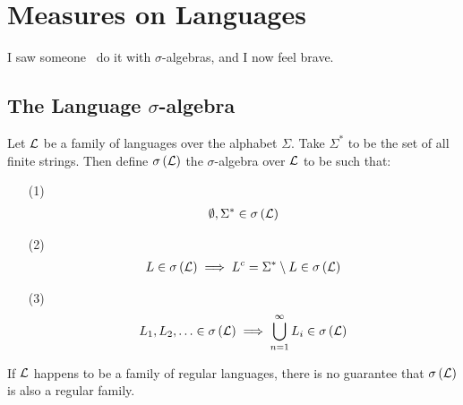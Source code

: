 \section{Measures on Languages}
I saw someone~\cite{aaa} do it with \(\sigma\)-algebras, and I now feel brave.

\subsection{The Language \(\sigma\)-algebra}
Let \(\mathcal{L}\) be a family of languages over the alphabet \(\Sigma\).
Take \(\Sigma^\ast\) to be the set of all finite strings.
Then define \(\sigma\left(\mathcal{L}\right)\)
the \(\sigma\)-algebra over \(\mathcal{L}\) to be
such that:
\begin{enumerate}
  \item[(1)]
    \begin{align*}
      \emptyset, \Sigma^\ast \in \sigma\left(\mathcal{L}\right)
    \end{align*}

  \item[(2)]
    \begin{align*}
      L \in \sigma\left(\mathcal{L}\right)
        \implies
          L^c = \Sigma^\ast \setminus L \in \sigma\left(\mathcal{L}\right)
    \end{align*}

  \item[(3)]
    \begin{align*}
      L_1, L_2, \ldots \in \sigma\left(\mathcal{L}\right)
        \implies
      \bigcup_{n = 1}^{\infty} L_i \in \sigma\left(\mathcal{L}\right)
    \end{align*}
\end{enumerate}

If \(\mathcal{L}\) happens to be a family of regular languages,
there is no guarantee that \(\sigma\left(\mathcal{L}\right)\)
is also a regular family.

